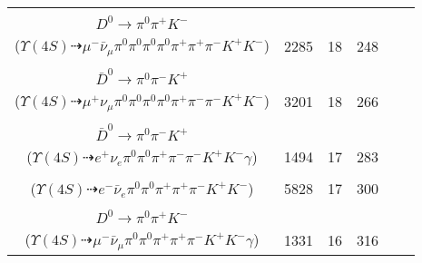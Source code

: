 \documentclass[landscape]{article}
\newcounter{rownumbers}
\newcommand\rn{\stepcounter{rownumbers}\arabic{rownumbers}}
\newcommand{\EOLP}{\\ \hline} %
\newcommand{\topoTags}[1]{#1} %
\begin{document}
\begin{longtable}{clcccc}
\rn & \makecell[l]{ $ 
\Upsilon(4S) \rightarrow B^{+} B^{-} ,
B^{+} \rightarrow \rho^{+} \bar{D}^{0} ,
B^{-} \rightarrow \mu^{-} \bar{\nu}_{\mu} D^{*0} ,
\rho^{+} \rightarrow \pi^{0} \pi^{+} ,
\bar{D}^{0} \rightarrow \pi^{0} \pi^{-} K^{+} ,
D^{*0} \rightarrow \pi^{0} D^{0} ,
$ \\ $
D^{0} \rightarrow \pi^{0} \pi^{+} K^{-} 
$ \\ ($
\Upsilon(4S) \dashrightarrow \mu^{-} \bar{\nu}_{\mu} \pi^{0} \pi^{0} \pi^{0} \pi^{0} \pi^{+} \pi^{+} \pi^{-} K^{+} K^{-} 
$) } & \topoTags{2285 & }18 & 248 \EOLP

\rn & \makecell[l]{ $ 
\Upsilon(4S) \rightarrow B^{+} B^{-} ,
B^{+} \rightarrow \mu^{+} \nu_{\mu} \bar{D}^{*0} ,
B^{-} \rightarrow \rho^{-} D^{0} ,
\bar{D}^{*0} \rightarrow \pi^{0} \bar{D}^{0} ,
\rho^{-} \rightarrow \pi^{0} \pi^{-} ,
D^{0} \rightarrow \pi^{0} \pi^{+} K^{-} ,
$ \\ $
\bar{D}^{0} \rightarrow \pi^{0} \pi^{-} K^{+} 
$ \\ ($
\Upsilon(4S) \dashrightarrow \mu^{+} \nu_{\mu} \pi^{0} \pi^{0} \pi^{0} \pi^{0} \pi^{+} \pi^{-} \pi^{-} K^{+} K^{-} 
$) } & \topoTags{3201 & }18 & 266 \EOLP

\rn & \makecell[l]{ $ 
\Upsilon(4S) \rightarrow B^{+} B^{-} ,
B^{+} \rightarrow e^{+} \nu_{e} \bar{D}^{*0} ,
B^{-} \rightarrow \rho^{-} D^{0} ,
\bar{D}^{*0} \rightarrow \bar{D}^{0} \gamma ,
\rho^{-} \rightarrow \pi^{0} \pi^{-} ,
D^{0} \rightarrow \pi^{+} K^{-} ,
$ \\ $
\bar{D}^{0} \rightarrow \pi^{0} \pi^{-} K^{+} 
$ \\ ($
\Upsilon(4S) \dashrightarrow e^{+} \nu_{e} \pi^{0} \pi^{0} \pi^{+} \pi^{-} \pi^{-} K^{+} K^{-} \gamma 
$) } & \topoTags{1494 & }17 & 283 \EOLP

\rn & \makecell[l]{ $ 
\Upsilon(4S) \rightarrow B^{+} B^{-} ,
B^{+} \rightarrow \rho^{+} \bar{D}^{0} ,
B^{-} \rightarrow e^{-} \bar{\nu}_{e} D^{0} ,
\rho^{+} \rightarrow \pi^{0} \pi^{+} ,
\bar{D}^{0} \rightarrow \pi^{-} K^{+} ,
D^{0} \rightarrow \pi^{0} \pi^{+} K^{-} 
$ \\ ($
\Upsilon(4S) \dashrightarrow e^{-} \bar{\nu}_{e} \pi^{0} \pi^{0} \pi^{+} \pi^{+} \pi^{-} K^{+} K^{-} 
$) } & \topoTags{5828 & }17 & 300 \EOLP

\rn & \makecell[l]{ $ 
\Upsilon(4S) \rightarrow B^{+} B^{-} ,
B^{+} \rightarrow \rho^{+} \bar{D}^{0} ,
B^{-} \rightarrow \mu^{-} \bar{\nu}_{\mu} D^{*0} ,
\rho^{+} \rightarrow \pi^{0} \pi^{+} ,
\bar{D}^{0} \rightarrow \pi^{-} K^{+} ,
D^{*0} \rightarrow D^{0} \gamma ,
$ \\ $
D^{0} \rightarrow \pi^{0} \pi^{+} K^{-} 
$ \\ ($
\Upsilon(4S) \dashrightarrow \mu^{-} \bar{\nu}_{\mu} \pi^{0} \pi^{0} \pi^{+} \pi^{+} \pi^{-} K^{+} K^{-} \gamma 
$) } & \topoTags{1331 & }16 & 316 \EOLP


\end{longtable}
\end{document}
